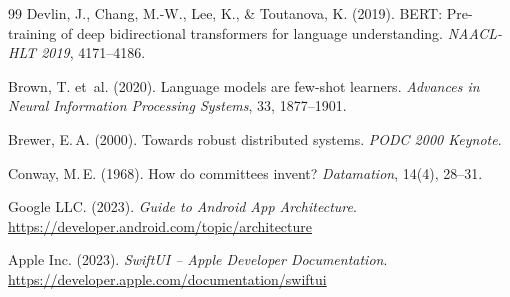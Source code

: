 ﻿\documentclass[a4paper,12pt]{article}
\theoremstyle{definition}
\begin{document}
\begin{thebibliography}{99}
Devlin, J., Chang, M.-W., Lee, K., \& Toutanova, K. (2019).
BERT: Pre-training of deep bidirectional transformers for language
understanding.
\textit{NAACL-HLT 2019}, 4171--4186.

Brown, T. et~al. (2020).
Language models are few-shot learners.
\textit{Advances in Neural Information Processing Systems}, 33, 1877--1901.

Brewer, E.\,A. (2000).
Towards robust distributed systems.
\textit{PODC 2000 Keynote}.

Conway, M.\,E. (1968).
How do committees invent?
\textit{Datamation}, 14(4), 28--31.

Google LLC. (2023).
\textit{Guide to Android App Architecture}.
\url{https://developer.android.com/topic/architecture}

Apple Inc. (2023).
\textit{SwiftUI -- Apple Developer Documentation}.
\url{https://developer.apple.com/documentation/swiftui}

\end{thebibliography}
\end{document}
